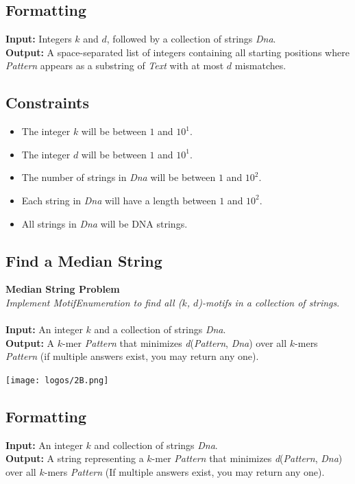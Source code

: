 \documentclass{article}
\begin{document}
\subsection*{Formatting}
\textbf{Input:} Integers $k$ and $d$, followed by a collection of strings \emph{Dna}.\\
\noindent\textbf{Output:} A space-separated list of integers containing all starting positions where \emph{Pattern} appears as a substring of \emph{Text} with at most $d$ mismatches.

\subsection*{Constraints}
\begin{itemize}
    \item The integer $k$ will be between $1$ and $10^1$.
    \item The integer $d$ will be between $1$ and $10^1$.
    \item The number of strings in \emph{Dna} will be between $1$ and $10^2$.
    \item Each string in \emph{Dna} will have a length between $1$ and $10^2$.
    \item All strings in \emph{Dna} will be DNA strings.
\end{itemize}
\pagebreak
\subsection{Find a Median String}
\hline\vspace{5}
\noindent\textbf{Median String Problem}\\
\emph{Implement MotifEnumeration to find all ($k$, $d$)-motifs in a collection of strings}.\\ \\
\textbf{Input:} An integer $k$ and a collection of strings \emph{Dna}.\\
\textbf{Output:} A $k$-mer \emph{Pattern} that minimizes \emph{d}(\emph{Pattern}, \emph{Dna}) over all $k$-mers \emph{Pattern} (if multiple answers exist, you may return any one).
\begin{center}
    \texttt{[image: logos/2B.png]} 
\end{center}
\hline\vspace{5}

\subsection*{Formatting}
\textbf{Input:} An integer $k$ and collection of strings \emph{Dna}.\\
\noindent\textbf{Output:} A string representing a $k$-mer \emph{Pattern} that minimizes \emph{d}(\emph{Pattern}, \emph{Dna}) over all $k$-mers \emph{Pattern} (If multiple answers exist, you may return any one).
\end{document}
